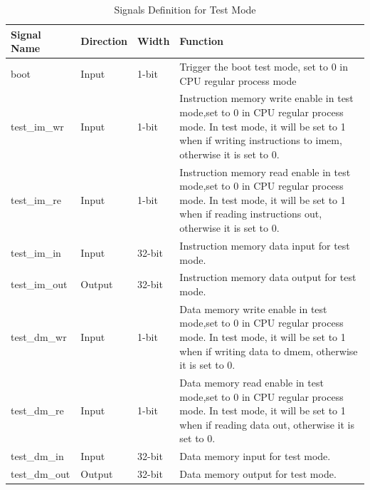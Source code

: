\documentclass[a4paper]{article}
\begin{document}
\begin{table}[h]
\caption{Signals Definition for Test Mode}\label{tab:signaldef}
\begin{center}
	\begin{tabular}{|l|l|l|p{7cm}|}
	\hline
	Signal Name 	& Direction & Width & Function\\ \hline
	boot			& Input 	& 1-bit	& Trigger the boot test mode, 
									  set to 0 in CPU regular process mode\\ \hline
	test\_im\_wr 	& Input	& 1-bit	& Instruction memory write enable in test mode,set to 0 in 	
								  CPU regular process mode. In test mode, it will be set to 1 when if writing instructions to imem, otherwise it is set to 0.\\ \hline
	test\_im\_re 	& Input & 1-bit & Instruction memory read enable in test mode,set to 0 in 	
								  CPU regular process mode. In test mode, it will be set to 1 when if reading instructions out, otherwise it is set to 0. \\ \hline
	test\_im\_in 	& Input & 32-bit& Instruction memory data input for test mode. \\ \hline
	test\_im\_out 	& Output& 32-bit& Instruction memory data output for test mode. \\ \hline
	test\_dm\_wr 	& Input	& 1-bit	& Data memory write enable in test mode,set to 0 in 	
								  CPU regular process mode. In test mode, it will be set to 1 when if writing data to dmem, otherwise it is set to 0.\\ \hline
	test\_dm\_re 	& Input & 1-bit & Data memory read enable in test mode,set to 0 in 	
								  CPU regular process mode. In test mode, it will be set to 1 when if reading data out, otherwise it is set to 0.\\ \hline
	test\_dm\_in 	& Input & 32-bit& Data memory input for test mode. \\ \hline
	test\_dm\_out 	& Output& 32-bit& Data memory output for test mode. \\ \hline
	\hline
	\end{tabular}
\end{center}
\end{table}
\end{document}
